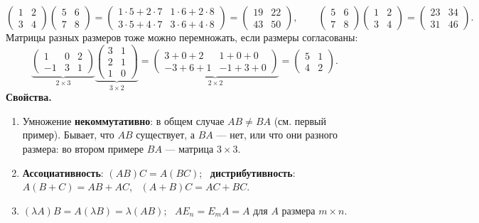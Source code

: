 \[
\begin{pmatrix}1&2\\3&4\end{pmatrix}\begin{pmatrix}5&6\\7&8\end{pmatrix}
=\begin{pmatrix}1\cdot5+2\cdot7&1\cdot6+2\cdot8\\3\cdot5+4\cdot7&3\cdot6+4\cdot8\end{pmatrix}
=\begin{pmatrix}19&22\\43&50\end{pmatrix},
\qquad
\begin{pmatrix}5&6\\7&8\end{pmatrix}\begin{pmatrix}1&2\\3&4\end{pmatrix}=\begin{pmatrix}23&34\\31&46\end{pmatrix}.
\]
Матрицы разных размеров тоже можно перемножать, если размеры согласованы:
\[
\underbrace{\begin{pmatrix}1&0&2\\-1&3&1\end{pmatrix}}_{2\times3}
\underbrace{\begin{pmatrix}3&1\\2&1\\1&0\end{pmatrix}}_{3\times2}
=\underbrace{\begin{pmatrix}3+0+2&1+0+0\\-3+6+1&-1+3+0\end{pmatrix}}_{2\times2}
=\begin{pmatrix}5&1\\4&2\end{pmatrix}.
\]
\textbf{Свойства.}
\begin{enumerate}
  \item Умножение \textbf{некоммутативно}: в общем случае $AB\ne BA$ (см. первый пример). Бывает, что $AB$ существует, а $BA$ --- нет, или что они разного размера: во втором примере $BA$ --- матрица $3\times3$.
  \item \textbf{Ассоциативность}: $(AB)C=A(BC)$; \ \textbf{дистрибутивность}: $A(B+C)=AB+AC$, \ $(A+B)C=AC+BC$.
  \item $(\lambda A)B=A(\lambda B)=\lambda(AB)$; \ $AE_n=E_mA=A$ для $A$ размера $m\times n$.
\end{enumerate}

